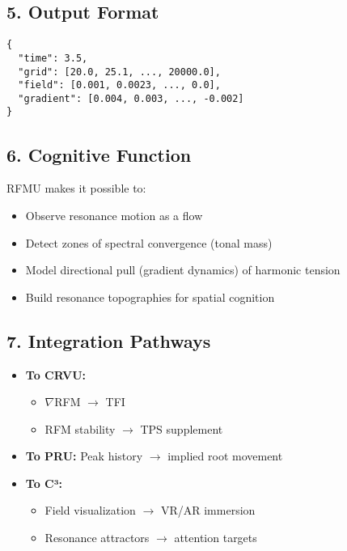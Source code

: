 \subsection*{5. Output Format}

\begin{verbatim}
{
  "time": 3.5,
  "grid": [20.0, 25.1, ..., 20000.0],
  "field": [0.001, 0.0023, ..., 0.0],
  "gradient": [0.004, 0.003, ..., -0.002]
}
\end{verbatim}

\subsection*{6. Cognitive Function}

RFMU makes it possible to:

\begin{itemize}
    \item Observe resonance motion as a flow
    \item Detect zones of spectral convergence (tonal mass)
    \item Model directional pull (gradient dynamics) of harmonic tension
    \item Build resonance topographies for spatial cognition
\end{itemize}

\subsection*{7. Integration Pathways}

\begin{itemize}
    \item \textbf{To CRVU:}
    \begin{itemize}
        \item $\nabla$RFM $\rightarrow$ TFI
        \item RFM stability $\rightarrow$ TPS supplement
    \end{itemize}
    \item \textbf{To PRU:} Peak history $\rightarrow$ implied root movement
    \item \textbf{To C³:}
    \begin{itemize}
        \item Field visualization $\rightarrow$ VR/AR immersion
        \item Resonance attractors $\rightarrow$ attention targets
    \end{itemize}
\end{itemize}

